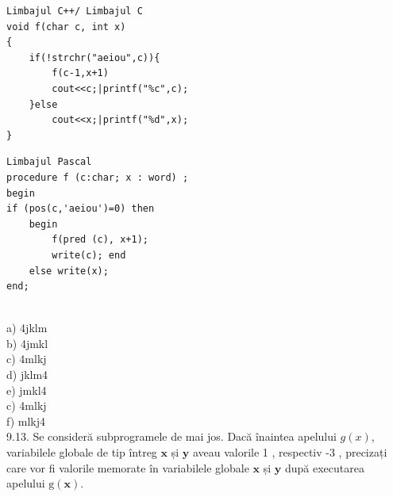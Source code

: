 \begin{verbatim}
Limbajul C++/ Limbajul C
void f(char c, int x)
{
    if(!strchr("aeiou",c)){
        f(c-1,x+1)
        cout<<c;|printf("%c",c);
    }else
        cout<<x;|printf("%d",x);
}
\end{verbatim}
\begin{verbatim}
Limbajul Pascal
procedure f (c:char; x : word) ;
begin
if (pos(c,'aeiou')=0) then
    begin
        f(pred (c), x+1);
        write(c); end
    else write(x);
end;
\end{verbatim}
\\
a) 4jklm
\\
b) 4jmkl
\\
c) 4mlkj
\\
d) jklm4
\\
e) jmkl4
\\
c) 4mlkj
\\
f) mlkj4
\\
9.13. Se consideră subprogramele de mai jos. Dacă înaintea apelului $g(x)$, variabilele globale de tip întreg $\mathbf{x}$ și $\mathbf{y}$ aveau valorile 1 , respectiv -3 , precizați care vor fi valorile memorate în variabilele globale $\mathbf{x}$ și $\mathbf{y}$ după executarea apelului $\mathrm{g}(\mathbf{x})$.


